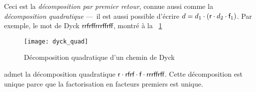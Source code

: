 Ceci est la \emph{décomposition par premier retour}, connue aussi comme la
\emph{décomposition quadratique} ---~il est aussi possible
d'écrire \(d = d_1 \cdot (\textsf{r} \cdot d_2 \cdot \textsf{f}_1)\). Par
exemple, le mot de Dyck \(\textsf{rrfrffrrrffrff}\), montré à la
\fig~\ref{fig:dyck_quad}
\begin{figure}
\centering
\texttt{[image: dyck\_quad]}
\caption{Décomposition quadratique d'un chemin de Dyck}
\label{fig:dyck_quad}
\end{figure}
admet la décomposition quadratique \(\textsf{r} \cdot \textsf{rfrf} \cdot
\textsf{f} \cdot \textsf{rrrffrff}\). Cette décomposition est unique parce
que la factorisation en facteurs premiers est unique.

